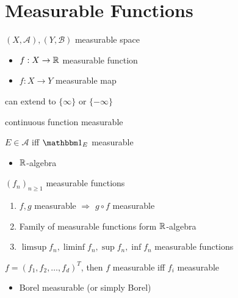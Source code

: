 \section{Measurable Functions}\label{sec:measurable-functions}

\begin{setting}
    $(X, \mathcal{A}), (Y, \mathcal{B})$ measurable space
\end{setting}

\begin{itemize}
    \item $f:X\rightarrow \mathbb{R}$ measurable function
    \item $f:X\rightarrow Y$ measurable map
\end{itemize}

\begin{fact}
    can extend to $\{\infty\}$ or $\{-\infty\}$
\end{fact}

\begin{fact}
    continuous function measurable
\end{fact}

\begin{fact}
    $E \in \mathcal{A}$ iff $\In_E$ measurable
\end{fact}

\begin{itemize}
    \item $\mathbb{R}$-algebra
\end{itemize}

\begin{prop}
    $(f_n)_{n \geq 1}$ measurable functions
    \begin{enumerate}
        \item $f, g$ measurable $\Rightarrow$ $g \circ f$ measurable
        \item Family of measurable functions form $\mathbb{R}$-algebra
        \item $\limsup f_n, \liminf f_n, \sup f_n, \inf f_n$ measurable functions
    \end{enumerate}
\end{prop}

\begin{prop}
    $f = (f_1, f_2, \dots, f_d)^T$, then $f$ measurable iff $f_i$ measurable
\end{prop}

\begin{itemize}
    \item Borel measurable (or simply Borel)
\end{itemize}


